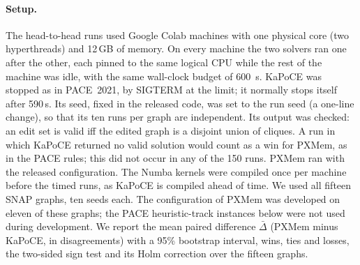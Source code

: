 \paragraph{Setup.}  The head-to-head runs used Google Colab machines with one
physical core (two hyperthreads) and 12\,GB of memory.  On every machine the
two solvers ran one after the other, each pinned to the same logical CPU while
the rest of the machine was idle, with the same wall-clock budget of
\SI{600}{s}.  KaPoCE was stopped as in PACE~2021, by SIGTERM at the limit; it
normally stops itself after 590\,s.  Its seed, fixed in the released code, was
set to the run seed (a one-line change), so that its ten runs per graph are
independent.  Its output was checked: an edit set is valid iff the edited graph
is a disjoint union of cliques.  A run in which KaPoCE returned no valid
solution would count as a win for PXMem, as in the PACE rules; this did not
occur in any of the 150 runs.  PXMem ran with the released configuration.  The
Numba kernels were compiled once per machine before the timed runs, as KaPoCE
is compiled ahead of time.  We used all fifteen SNAP graphs, ten seeds each.
The configuration of PXMem was developed on eleven of these graphs; the PACE
heuristic-track instances below were not used during development.  We report
the mean paired difference $\bar\Delta$ (PXMem minus KaPoCE, in
disagreements) with a 95\% bootstrap interval, wins, ties and losses, the
two-sided sign test and its Holm correction over the fifteen graphs.

\begin{table}[!tbp]
\centering
\caption{PXMem against KaPoCE, \SI{600}{s} per run, run one after the other on
the same machine and CPU (ten seeds per graph).  Mean costs; $\bar\Delta$: mean
paired difference PXMem$-$KaPoCE with a 95\% bootstrap interval; W/T/L: wins,
ties and losses of PXMem; $p$: two-sided sign test; $p_{\mathrm{Holm}}$: Holm
correction over the fifteen graphs (bold if below $0.05$); $t_{=}$: median time
at which PXMem first reached the final cost of KaPoCE (``--'' if it did not in
most runs).  KaPoCE returned a valid solution in every run.}\label{tab:h2h}
\small
\resizebox{\textwidth}{!}{}
\end{table}

